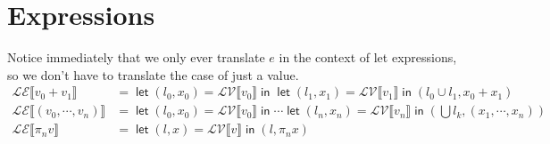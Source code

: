 \documentclass[11pt,a4paper]{article}
\newcommand {\coo} [1] {\ensuremath{\operatorname{\mathsf{#1}}}}
\newcommand{\Let}[1]{\coo{let} #1 \coo{in} }
\newcommand{\trans}[2]{\ensuremath{\mathcal{#1}\llbracket #2\rrbracket}}
\begin{document}
\section{Expressions}
Notice immediately that we only ever translate $e$ in the context of let expressions, so we don't have to translate the case of just a value.
\begin{align*}
\trans{LE}{v_0 + v_1} &= \Let{(l_0, x_0) = \trans{LV}{v_0}}{\Let{(l_1,x_1) = \trans{LV}{v_1}}{(l_0 \cup l_1, x_0 + x_1)}} \\
\trans{LE}{(v_0, \cdots, v_n)} &= \Let{(l_0, x_0) = \trans{LV}{v_0}}{\cdots\Let{(l_n,x_n) = \trans{LV}{v_n}}{(\bigcup l_k, (x_1,\cdots, x_n))}} \\
\trans{LE}{\pi_n v} &= \Let{(l,x) = \trans{LV}{v}}{(l, \pi_n x)}
\end{align*}
\end{document}
